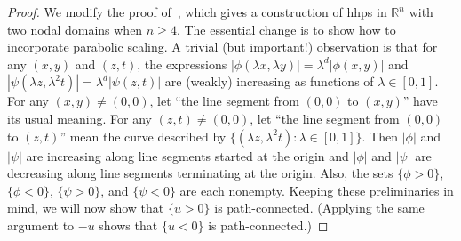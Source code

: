 \documentclass[10pt]{amsart}
\theoremstyle{definition}\newtheorem{defi}[theo]{Definition}\newtheorem{rema}[theo]{Remark}\newtheorem{exam}[theo]{Example}\newtheorem{exem}[theo]{Example}\newtheorem{nota}[theo]{Notation}
\newcommand{\R}{\mathbb{R}}
\begin{document}
\begin{proof}
We modify the proof of~\cite[Lemma~1.7]{BET17}, which gives a construction of hhps in $\R^n$ with two nodal domains when $n\geq 4$. The essential change is to show how to incorporate parabolic scaling. A trivial (but important!) observation is that for any $(x,y)$ and $(z,t)$, the expressions $|\phi(\lambda x,\lambda y)|=\lambda^d|\phi(x,y)|$ and $|\psi(\lambda z,\lambda^2t)|=\lambda^d|\psi(z,t)|$ are (weakly) increasing as functions of $\lambda\in[0,1]$. For any $(x,y)\neq (0,0)$, let ``the line segment from $(0,0)$ to $(x,y)$'' have its usual meaning. For any $(z,t)\neq (0,0)$,\pagebreak{} let ``the line segment from $(0,0)$ to $(z,t)$'' mean the curve described by $\{(\lambda z,\lambda^2 t): \lambda\in[0,1]\}$. Then $|\phi|$ and $|\psi|$ are increasing along line segments started at the origin and $|\phi|$ and $|\psi|$ are decreasing along line segments terminating at the origin. Also, the sets $\{\phi>0\}$, $\{\phi<0\}$, $\{\psi>0\}$, and $\{\psi<0\}$ are each nonempty. Keeping these preliminaries in mind, we will now show that $\{u>0\}$ is path-connected. (Applying the same argument to $-u$ shows that $\{u<0\}$ is path-connected.)


\end{proof}
\end{document}
